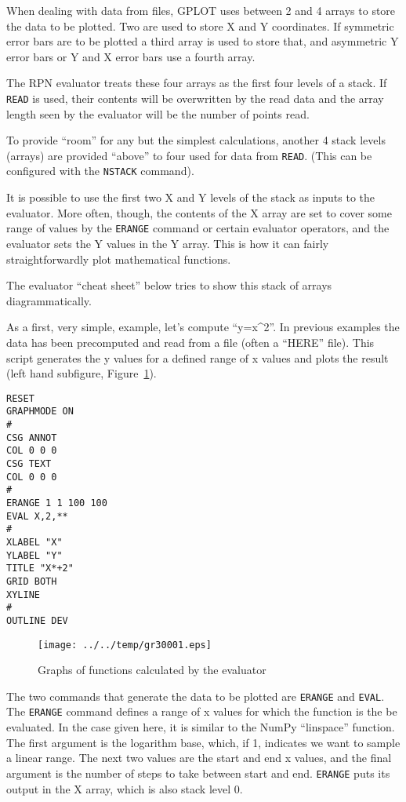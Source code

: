\documentclass[a4paper,twoside,11pt]{article}
\makeatletter
\def\maxwidth{%
  \ifdim\Gin@nat@width>\linewidth
    \linewidth
  \else
    \Gin@nat@width
  \fi
}
\newcommand{\newpara}{\par\vspace{4mm}\noindent}
\makeatother
\begin{document}
\newpara
When dealing with data from files, GPLOT uses between 2 and 4 arrays to
store the data to be plotted. Two are used to store X and Y coordinates.
If symmetric error bars are to be plotted a third array is used to store
that, and asymmetric Y error bars or Y and X error bars use a fourth
array.

\newpara
The RPN evaluator treats these four arrays as the first four levels of a
stack. If \texttt{READ} is used, their contents will be overwritten by
the read data and the array length seen by the evaluator will be the
number of points read.

\newpara
To provide ``room'' for any but the simplest calculations, another 4
stack levels (arrays) are provided ``above'' to four used for data from
\texttt{READ}. (This can be configured with the \texttt{NSTACK}
command).

\newpara
It is possible to use the first two X and Y levels of the stack as
inputs to the evaluator. More often, though, the contents of the X array
are set to cover some range of values by the \texttt{ERANGE} command or
certain evaluator operators, and the evaluator sets the Y values in the
Y array. This is how it can fairly straightforwardly plot mathematical
functions.

\newpara
The evaluator ``cheat sheet'' below tries to show this stack of arrays
diagrammatically.

\newpara
As a first, very simple, example, let's compute ``y=x\^{}2''. In
previous examples the data has been precomputed and read from a file
(often a ``HERE'' file). This script generates the y values for a
defined range of x values and plots the result (left hand subfigure,
Figure~\ref{fig:gr30001}).

\begin{lstlisting}
RESET
GRAPHMODE ON
#
CSG ANNOT
COL 0 0 0
CSG TEXT
COL 0 0 0
#
ERANGE 1 1 100 100
EVAL X,2,**
#
XLABEL "X"
YLABEL "Y"
TITLE "X*+2"
GRID BOTH
XYLINE
#
OUTLINE DEV
\end{lstlisting}

\begin{figure}
  \centering
  \texttt{[image: ../../temp/gr30001.eps]}
  \caption{Graphs of functions calculated by the evaluator}
  \label{fig:gr30001}
\end{figure}

\newpara
The two commands that generate the data to be plotted are
\texttt{ERANGE} and \texttt{EVAL}. The \texttt{ERANGE} command defines a
range of x values for which the function is the be evaluated. In the
case given here, it is similar to the NumPy ``linspace'' function. The
first argument is the logarithm base, which, if 1, indicates we want to
sample a linear range. The next two values are the start and end x
values, and the final argument is the number of steps to take between
start and end. \texttt{ERANGE} puts its output in the X array, which is
also stack level 0.
\end{document}
